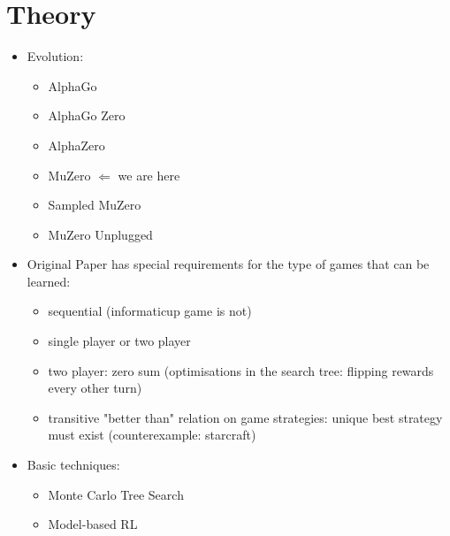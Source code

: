 \chapter{Theory}

\begin{itemize}
    \item Evolution:
    \begin{itemize}
        \item AlphaGo
        \item AlphaGo Zero \cite{alphago_zero}
        \item AlphaZero \cite{alphazero}
        \item MuZero \cite{muzero} $\Longleftarrow$ we are here
        \item Sampled MuZero
        \item MuZero Unplugged
    \end{itemize}
    \item Original Paper has special requirements for the type of games
    that can be learned:
    \begin{itemize}
        \item sequential (informaticup game is not)
        \item single player or two player
        \item two player: zero sum (optimisations in the search tree:
        flipping rewards every other turn)
        \item transitive "better than" relation on game strategies: unique best
        strategy must exist (counterexample: starcraft)
    \end{itemize}
    \item Basic techniques:
    \begin{itemize}
        \item Monte Carlo Tree Search \cite{mcts_survey}
        \item Model-based RL
    \end{itemize}
\end{itemize}
